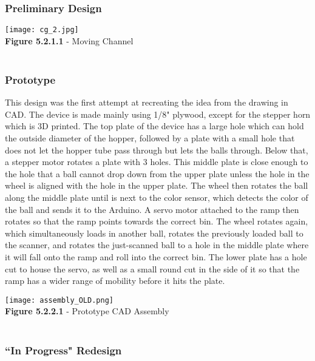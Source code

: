 \documentclass{article}
\begin{document}
\subsubsection{Preliminary Design}

\begin{center}
    \texttt{[image: cg\_2.jpg]}\\
    \small{\textbf{Figure 5.2.1.1} - Moving Channel}\\~\\
\end{center}

\subsubsection{Prototype}

This design was the first attempt at recreating the idea from the drawing in CAD. The device is made mainly using 1/8" plywood, except for the stepper horn which is 3D printed. The top plate of the device has a large hole which can hold the outside diameter of the hopper, followed by a plate with a small hole that does not let the hopper tube pass through but lets the balls through. Below that, a stepper motor rotates a plate with 3 holes. This middle plate is close enough to the hole that a ball cannot drop down from the upper plate unless the hole in the wheel is aligned with the hole in the upper plate. The wheel then rotates the ball along the middle plate until is next to the color sensor, which detects the color of the ball and sends it to the Arduino. A servo motor attached to the ramp then rotates so that the ramp points towards the correct bin. The wheel rotates again, which simultaneously loads in another ball, rotates the previously loaded ball to the scanner, and rotates the just-scanned ball to a hole in the middle plate where it will fall onto the ramp and roll into the correct bin. The lower plate has a hole cut to house the servo, as well as a small round cut in the side of it so that the ramp has a wider range of mobility before it hits the plate.

\begin{center}
    \texttt{[image: assembly\_OLD.png]}\\
    \small{\textbf{Figure 5.2.2.1} - Prototype CAD Assembly}\\~\\
\end{center}

\subsubsection{``In Progress" Redesign}
\end{document}
